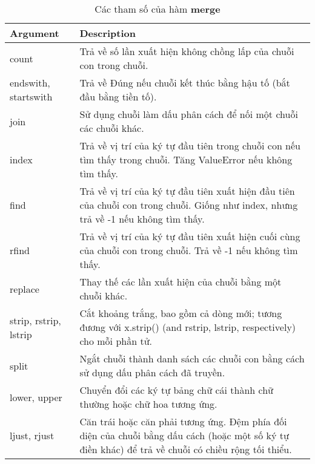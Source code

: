 \begin{table}[h]
\centering
    \begin{tabular}{l|p{10cm}}
      Argument   & Description \\ \hline
         count   & Trả về số lần xuất hiện không chồng lấp của chuỗi con trong chuỗi.\\ 
endswith, startswith & Trả về Đúng nếu chuỗi kết thúc bằng hậu tố (bắt đầu bằng tiền tố).\\ 
join   &  Sử dụng chuỗi làm dấu phân cách để nối một chuỗi các chuỗi khác.\\ 
index  &  Trả về vị trí của ký tự đầu tiên trong chuỗi con nếu tìm thấy trong chuỗi. Tăng ValueError nếu không tìm thấy.    \\ 
find &  Trả về vị trí của ký tự đầu tiên xuất hiện đầu tiên của chuỗi con trong chuỗi. Giống như index, nhưng trả về -1 nếu không tìm thấy.     \\ 
rfind &     Trả về vị trí của ký tự đầu tiên xuất hiện cuối cùng của chuỗi con trong chuỗi. Trả về -1 nếu không tìm thấy.  \\ 
replace &    Thay thế các lần xuất hiện của chuỗi bằng một chuỗi khác.   \\ 
strip, rstrip, lstrip &    Cắt khoảng trắng, bao gồm cả dòng mới; tương đương với x.strip() (and rstrip, lstrip, respectively) cho mỗi phần tử.  \\ 
split & Ngắt chuỗi thành danh sách các chuỗi con bằng cách sử dụng dấu phân cách đã truyền.      \\ 
lower, upper &      Chuyển đổi các ký tự bảng chữ cái thành chữ thường hoặc chữ hoa tương ứng. \\ 
ljust, rjust &  Căn trái hoặc căn phải tương ứng. Đệm phía đối diện của chuỗi bằng dấu cách (hoặc một số ký tự điền khác) để trả về chuỗi có chiều rộng tối thiểu.     
\end{tabular}
    \caption{Các tham số của hàm \textbf{merge}}
    \label{tab:table4}
\end{table}

